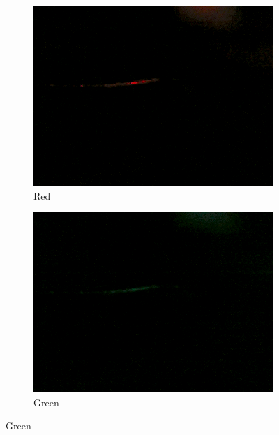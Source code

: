 		\begin{figure}
			\begin{subfigure}{0.24\textwidth}
				\includegraphics[width=\linewidth, keepaspectratio=true]{./fig/Vision/Dataset/automated_datasets/2_created_datasets/1_Birthday_dataset/b_003_p_005_b_l_006_red_B.png}
				\caption{Red}
			\end{subfigure}
			\hspace*{\fill}
			\begin{subfigure}{0.24\textwidth}
				\includegraphics[width=\linewidth, keepaspectratio=true]{./fig/Vision/Dataset/automated_datasets/2_created_datasets/1_Birthday_dataset/b_003_p_005_b_l_006_green_B.png}
				\caption{Green}
			\end{subfigure}

\end{figure}
